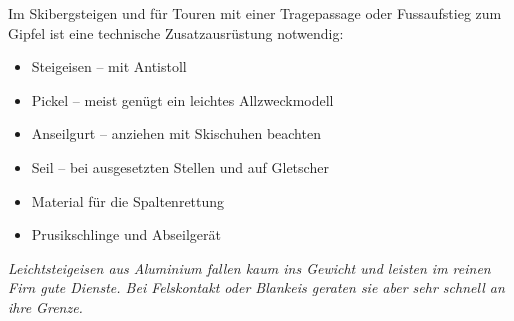\newcolumn

Im Skibergsteigen und für Touren mit einer Tragepassage oder Fussaufstieg zum Gipfel ist eine technische Zusatzausrüstung notwendig:

\begin{itemize}
  \item{Steigeisen -- mit Antistoll}
  \item{Pickel -- meist genügt ein leichtes Allzweckmodell}
  \item{Anseilgurt -- anziehen mit Skischuhen beachten}
  \item{Seil -- bei ausgesetzten Stellen und auf Gletscher}
  \item{Material für die Spaltenrettung}
  \item{Prusikschlinge und Abseilgerät}
\end{itemize}

\textit{Leichtsteigeisen aus Aluminium fallen kaum ins Gewicht und leisten im reinen Firn gute Dienste. Bei Felskontakt oder Blankeis geraten sie aber sehr schnell an ihre Grenze.}
